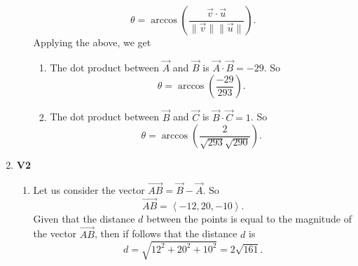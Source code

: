 \documentclass[12pt,oneside]{book}
\begin{document}
\begin{enumerate}
\begin{enumerate}
\[                \theta = \arccos \left( \frac{\vec{v} \cdot \vec{u}}{\| \vec{v} \| \| \vec{u} \|} \right)
            .\]  Applying the above, we get \begin{enumerate}
                \item The dot product between $\vec{A}$ and $\vec{B}$ is $\vec{A} \cdot \vec{B} = -29$. So \[
                    \theta = \arccos \left( \frac{-29}{293} \right)
                .\] 
                \item The dot product between $\vec{B}$ and $\vec{C}$ is $\vec{B} \cdot \vec{C} = 1$. So \[
                    \theta = \arccos \left( \frac{2}{\sqrt{293} \sqrt{290} } \right)
                .\] 
            \end{enumerate}
        \end{enumerate}
	\item \textbf{V2} 
		\begin{enumerate}
			\item Let us consider the vector $\overrightarrow{AB} = \vec{B} - \vec{A}$. So \[
				\overrightarrow{AB} = \left\langle -12, 20, -10 \right\rangle
			.\] Given that the distance $d$ between the points is equal to the magnitude of the vector $\overrightarrow{AB}$, then if follows that the distance $d$ is \[
				d = \sqrt{12^2 + 20^2 + 10^2} = 2 \sqrt{161}
			.\]
		\end{enumerate}
        

\end{enumerate}
\end{document}
